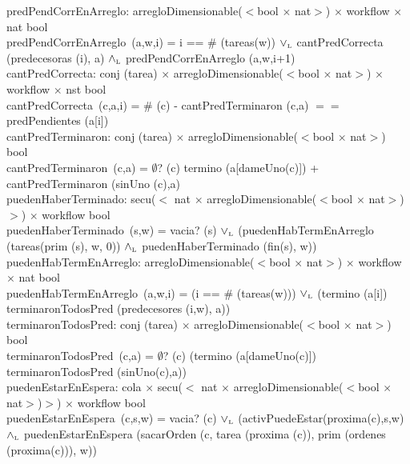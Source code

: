 \documentclass[a4paper,10pt]{article}
\begin{document}
		predPendCorrEnArreglo: arregloDimensionable($<$bool $\times$ nat$>$) $\times$ workflow $\times$ nat \en bool\\
	\indent predPendCorrEnArreglo\ (a,w,i) =  i == $\#$ (tareas(w)) $\lor_{\mathrm{\scriptscriptstyle{L}}}$ cantPredCorrecta (predecesoras (i), a) $\land_{\mathrm{\scriptscriptstyle{L}}}$ predPendCorrEnArreglo (a,w,i+1) \\  
	
	cantPredCorrecta: conj (tarea) $\times$ arregloDimensionable($<$bool $\times$ nat$>$) $\times$ workflow $\times$ nst \en bool\\
	\indent cantPredCorrecta\ (c,a,i) =   $\#$ (c) - cantPredTerminaron (c,a) $==$ predPendientes (a[i]) \\  
	
	cantPredTerminaron: conj (tarea) $\times$ arregloDimensionable($<$bool $\times$ nat$>$) \en bool\\
	\indent cantPredTerminaron\ (c,a) = \lif  $\emptyset$? (c)  \lelse \lif termino (a[dameUno(c)])   \lfi + cantPredTerminaron (sinUno (c),a) \lfi \\ 
		 
	 	puedenHaberTerminado: secu($<$ nat $\times$ arregloDimensionable($<$bool $\times$ nat$>$)$>$) $\times$ workflow \en bool\\
	\indent puedenHaberTerminado\ (s,w) =  vacia? (s) $\lor_{\mathrm{\scriptscriptstyle{L}}}$ (puedenHabTermEnArreglo (tareas(prim (s), w, 0)) $\land_{\mathrm{\scriptscriptstyle{L}}}$ puedenHaberTerminado (fin(s), w)) \\  
	
	puedenHabTermEnArreglo: arregloDimensionable($<$bool $\times$ nat$>$) $\times$ workflow $\times$ nat \en bool\\
	\indent puedenHabTermEnArreglo\ (a,w,i) =  (i == $\#$ (tareas(w))) $\lor_{\mathrm{\scriptscriptstyle{L}}}$ (termino (a[i]) \impluego terminaronTodosPred (predecesores (i,w), a)) \\  
	
	terminaronTodosPred: conj (tarea) $\times$ arregloDimensionable($<$bool $\times$ nat$>$) \en bool\\
	\indent terminaronTodosPred\ (c,a) =   $\emptyset$? (c) \oluego (termino (a[dameUno(c)]) \yluego terminaronTodosPred (sinUno(c),a))\\ 
	
	 	puedenEstarEnEspera: cola $\times$ secu($<$ nat $\times$ arregloDimensionable($<$bool $\times$ nat$>$)$>$) $\times$ workflow \en bool\\
	\indent puedenEstarEnEspera\ (c,s,w) =  vacia? (c) $\lor_{\mathrm{\scriptscriptstyle{L}}}$ (activPuedeEstar(proxima(c),s,w) $\land_{\mathrm{\scriptscriptstyle{L}}}$ puedenEstarEnEspera (sacarOrden (c, tarea (proxima (c)), prim (ordenes (proxima(c))), w)) \\  
	
\end{document}

